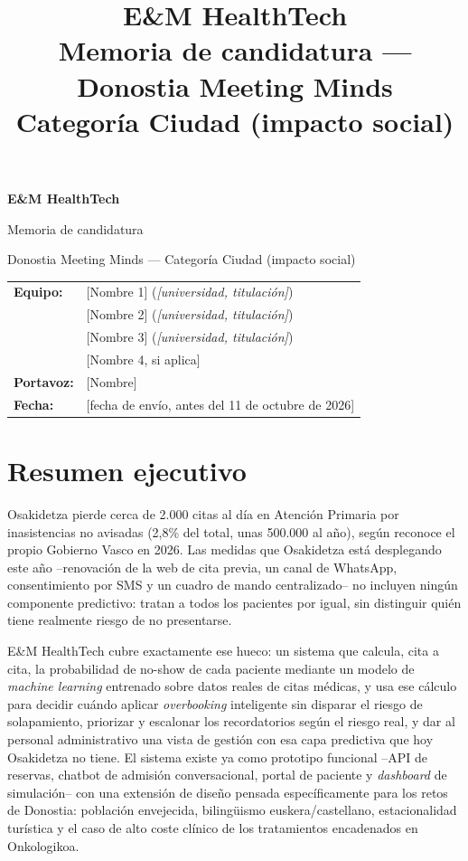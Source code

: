 \documentclass[11pt,a4paper]{article}
\title{\vspace{-1.5cm}\textbf{E\&M HealthTech}\\[4pt]\large Memoria de candidatura --- Donostia Meeting Minds\\\large Categoría Ciudad (impacto social)}
\author{}
\date{}
\begin{document}
\begin{titlepage}
\centering
\vspace*{3cm}
{\Huge\bfseries E\&M HealthTech\par}
\vspace{0.8cm}
{\Large Memoria de candidatura\par}
\vspace{0.3cm}
{\large Donostia Meeting Minds --- Categoría Ciudad (impacto social)\par}
\vfill
\begin{tabular}{ll}
\textbf{Equipo:} & [Nombre 1] (\textit{[universidad, titulación]}) \\
                  & [Nombre 2] (\textit{[universidad, titulación]}) \\
                  & [Nombre 3] (\textit{[universidad, titulación]}) \\
                  & [Nombre 4, si aplica] \\[6pt]
\textbf{Portavoz:} & [Nombre] \\[6pt]
\textbf{Fecha:} & [fecha de envío, antes del 11 de octubre de 2026] \\
\end{tabular}
\vspace{2cm}
\end{titlepage}

\section{Resumen ejecutivo}

Osakidetza pierde cerca de 2.000 citas al día en Atención Primaria por inasistencias no avisadas (2,8\% del total, unas 500.000 al año), según reconoce el propio Gobierno Vasco en 2026. Las medidas que Osakidetza está desplegando este año --renovación de la web de cita previa, un canal de WhatsApp, consentimiento por SMS y un cuadro de mando centralizado-- no incluyen ningún componente predictivo: tratan a todos los pacientes por igual, sin distinguir quién tiene realmente riesgo de no presentarse.

E\&M HealthTech cubre exactamente ese hueco: un sistema que calcula, cita a cita, la probabilidad de no-show de cada paciente mediante un modelo de \textit{machine learning} entrenado sobre datos reales de citas médicas, y usa ese cálculo para decidir cuándo aplicar \textit{overbooking} inteligente sin disparar el riesgo de solapamiento, priorizar y escalonar los recordatorios según el riesgo real, y dar al personal administrativo una vista de gestión con esa capa predictiva que hoy Osakidetza no tiene. El sistema existe ya como prototipo funcional --API de reservas, chatbot de admisión conversacional, portal de paciente y \textit{dashboard} de simulación-- con una extensión de diseño pensada específicamente para los retos de Donostia: población envejecida, bilingüismo euskera/castellano, estacionalidad turística y el caso de alto coste clínico de los tratamientos encadenados en Onkologikoa.
\end{document}
